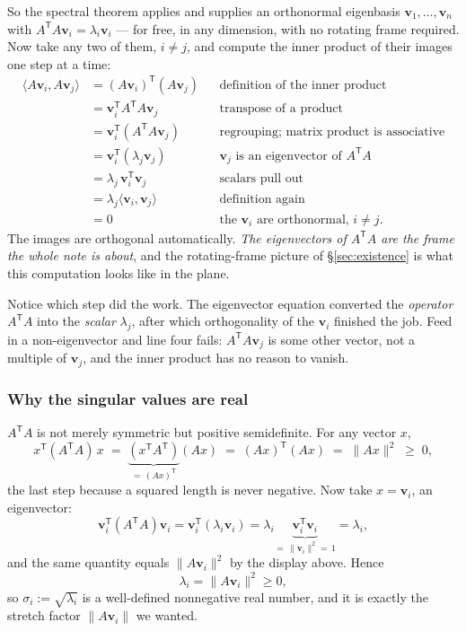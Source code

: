 \documentclass[11pt]{article}
\numberwithin{equation}{section}
\newcommand{\T}{^{\mathsf{T}}}
\newcommand{\ip}[2]{\langle #1, #2 \rangle}
\newcommand{\vv}[1]{\mathbf{v}_{#1}}
\theoremstyle{plainish}
\begin{document}
So the spectral theorem applies and supplies an orthonormal eigenbasis
$\vv1, \dots, \vv n$ with $A\T A \vv i = \lambda_i \vv i$ --- for free, in any
dimension, with no rotating frame required. Now take any two of them, $i \neq j$,
and compute the inner product of their images one step at a time:
\begin{align}
\ip{A\vv i}{A\vv j}
  &= (A\vv i)\T (A\vv j)          && \text{definition of the inner product} \nonumber \\
  &= \vv i\T A\T A \vv j          && \text{transpose of a product} \nonumber \\
  &= \vv i\T (A\T A \vv j)        && \text{regrouping; matrix product is associative} \nonumber \\
  &= \vv i\T (\lambda_j \vv j)    && \text{$\vv j$ is an eigenvector of $A\T A$} \nonumber \\
  &= \lambda_j \,\vv i\T \vv j    && \text{scalars pull out} \nonumber \\
  &= \lambda_j \ip{\vv i}{\vv j}  && \text{definition again} \nonumber \\
  &= 0                            && \text{the $\vv i$ are orthonormal, $i \neq j$.}
\end{align}
The images are orthogonal automatically. \emph{The eigenvectors of $A\T A$ are
the frame the whole note is about}, and the rotating-frame picture of
\S\ref{sec:existence} is what this computation looks like in the plane.

Notice which step did the work. The eigenvector equation converted the
\emph{operator} $A\T A$ into the \emph{scalar} $\lambda_j$, after which
orthogonality of the $\vv i$ finished the job. Feed in a non-eigenvector and
line four fails: $A\T A \vv j$ is some other vector, not a multiple of $\vv j$,
and the inner product has no reason to vanish.

\subsubsection*{Why the singular values are real}

$A\T A$ is not merely symmetric but positive semidefinite. For any vector $x$,
\begin{equation}x\T (A\T A)\, x
\;=\; \underbrace{(x\T A\T)}_{= \,(Ax)\T} (A x)
\;=\; (Ax)\T (Ax)
\;=\; \|Ax\|^2
\;\geq\; 0 ,
\end{equation}
the last step because a squared length is never negative. Now take $x = \vv i$,
an eigenvector:
\begin{equation}\vv i\T (A\T A) \vv i
= \vv i\T (\lambda_i \vv i)
= \lambda_i \underbrace{\vv i\T \vv i}_{=\,\|\vv i\|^2 =\, 1}
= \lambda_i ,
\end{equation}
and the same quantity equals $\|A\vv i\|^2$ by the display above. Hence
\begin{equation}\lambda_i = \|A \vv i\|^2 \geq 0,
\end{equation}
so $\sigma_i := \sqrt{\lambda_i}$ is a well-defined nonnegative real number, and
it is exactly the stretch factor $\|A\vv i\|$ we wanted.
\end{document}
